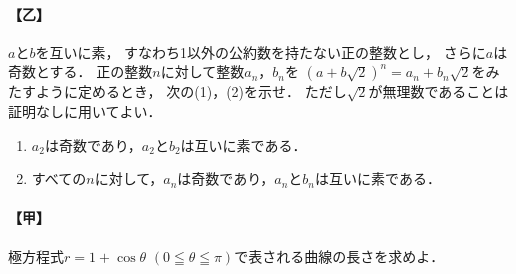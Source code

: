 \documentclass[../../main.tex]{subfiles}
\begin{document}
\paragraph{【乙】}
$a$と$b$を互いに素，
すなわち1以外の公約数を持たない正の整数とし，
さらに$a$は奇数とする．
正の整数$n$に対して整数$a_n$，$b_n$を
${(a+b\sqrt{2})}^n=a_n+b_n\sqrt{2}$をみたすように定めるとき，
次の(1)，(2)を示せ．
ただし$\sqrt{2}$が無理数であることは証明なしに用いてよい．
\begin{enumerate}
  \item $a_2$は奇数であり，$a_2$と$b_2$は互いに素である．
  \item すべての$n$に対して，$a_n$は奇数であり，$a_n$と$b_n$は互いに素である．
\end{enumerate}

\paragraph{【甲】}
極方程式$r = 1 + \cos\theta$ $(0 \leqq \theta \leqq \pi)$で表される曲線の長さを求めよ．
\end{document}
